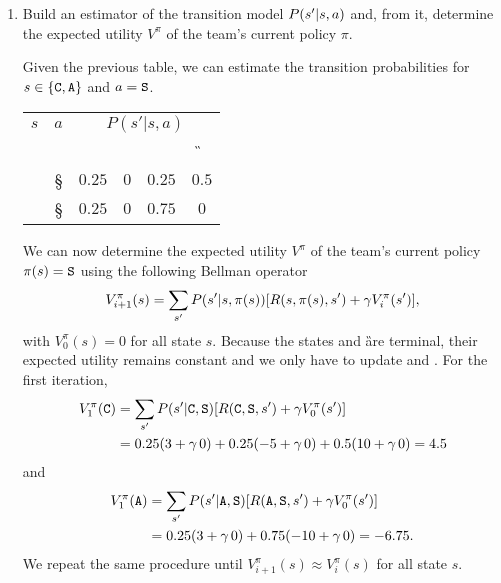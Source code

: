 \documentclass[11pt, a4paper]{article}
\begin{document}
\begin{enumerate}
    \item Build an estimator of the transition model $P(s' \knowing s, a)$ and, from it, determine the expected utility $V^\pi$ of the team's current policy $\pi$.
    \begin{solution}
        Given the previous table, we can estimate the transition probabilities for $s \in \cbk{\C, \A}$ and $a = \S$.

        \begin{table}[h]
            \centering
            \begin{tabular}{cc|cccc}
                \toprule
                 $s$ & $a$ & \multicolumn{4}{c}{$P(s' | s, a)$} \\
                     &     & \C & \A & \F & \G \\
                 \midrule
                 \C & \S & $0.25$ & $0$ & $0.25$ & $0.5$ \\
                 \A & \S & $0.25$ & $0$ & $0.75$ & $0$ \\
                 \bottomrule
            \end{tabular}
        \end{table}

        We can now determine the expected utility $V^\pi$ of the team's current policy $\pi(s) = \S$ using the following Bellman operator
        \begin{equation*}
            V_{i + 1}^\pi(s) = \sum_{s'} P(s' \knowing s, \pi(s)) \sbk*{R(s, \pi(s), s') + \gamma V_i^\pi(s')} ,
        \end{equation*}
        with $V_0^\pi(s) = 0$ for all state $s$. Because the states \F and \G are terminal, their expected utility remains constant and we only have to update \C and \A. For the first iteration,
        \begin{align*}
            V_1^\pi(\C) & = \sum_{s'} P(s' \knowing \C, \S) \sbk*{R(\C, \S, s') + \gamma V_0^\pi(s')} \\
            & = 0.25 (3 + \gamma \, 0) + 0.25 (-5 + \gamma \, 0) + 0.5 (10 + \gamma \, 0) = 4.5
        \end{align*}
        and
        \begin{align*}
            V_1^\pi(\A) & = \sum_{s'} P(s' \knowing \A, \S) \sbk*{R(\A, \S, s') + \gamma V_0^\pi(s')} \\
            & = 0.25 (3 + \gamma \, 0) + 0.75 (-10 + \gamma \, 0) = -6.75 .
        \end{align*}
        We repeat the same procedure until $V_{i + 1}^\pi(s) \approx V_i^\pi(s)$ for all state $s$.


\end{solution}
\end{enumerate}
\end{document}
